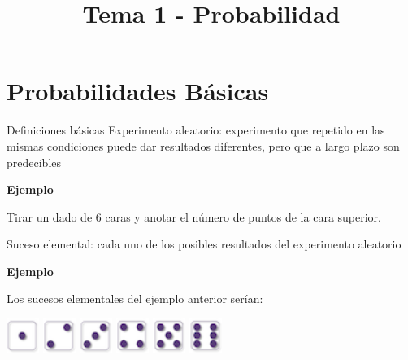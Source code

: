 \documentclass[
  ignorenonframetext,
]{beamer}
\title{Tema 1 - Probabilidad}
\author{}
\date{\vspace{-2.5em}}
\begin{document}
\frame{\titlepage}

\hypertarget{probabilidades-buxe1sicas}{%
\section{Probabilidades Básicas}\label{probabilidades-buxe1sicas}}

\begin{frame}{Definiciones básicas}
\protect\hypertarget{definiciones-buxe1sicas}{}
Experimento aleatorio: experimento que repetido en las mismas
condiciones puede dar resultados diferentes, pero que a largo plazo son
predecibles

\textbf{Ejemplo}

Tirar un dado de 6 caras y anotar el número de puntos de la cara
superior.

Suceso elemental: cada uno de los posibles resultados del experimento
aleatorio

\textbf{Ejemplo}

Los sucesos elementales del ejemplo anterior serían:

\includegraphics[width=0.42in]{Images/proba1dibujos/dice/1}
\includegraphics[width=0.42in]{Images/proba1dibujos/dice/2}
\includegraphics[width=0.42in]{Images/proba1dibujos/dice/3}
\includegraphics[width=0.42in]{Images/proba1dibujos/dice/4}
\includegraphics[width=0.42in]{Images/proba1dibujos/dice/5}
\includegraphics[width=0.42in]{Images/proba1dibujos/dice/6}
\end{frame}
\end{document}
